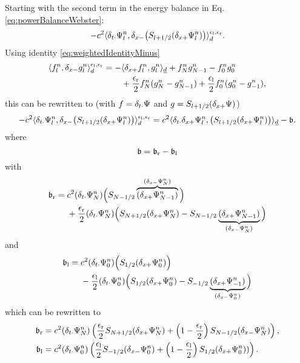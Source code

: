 Starting with the second term in the energy balance in Eq. \eqref{eq:powerBalanceWebster}:
\begin{equation}
    - c^2\langle\delta_{t\cdot}\Psi_l^n, \delta_{x-}\big(S_{l+1/2}(\delta_{x+}\Psi_l^n)\big)\rangle_d^{\epsilon_\text{l},\epsilon_\text{r}}.
\end{equation}
Using identity \eqref{eq:weightedIdentityMinus}
\begin{equation*}
    \begin{aligned}
    \langle f_l^n, \delta_{x-} g_l^n \rangle_d^{\epsilon_\text{l},\epsilon_\text{r}}  = -&\langle \delta_{x+} f_l^n, g_l^n \rangle_{\underline{d}}+ f_N^ng_{N-1}^n - f_0^ng_0^n \\
    &+ \frac{\epsilon_\text{r}}{2}f_N^n(g_N^n-g_{N-1}^n)+ \frac{\epsilon_\text{l}}{2}f_0^n(g_0^n - g_{-1}^n),
    \end{aligned}
\end{equation*}
this can be rewritten to (with $f=\delta_{t\cdot}\Psi$ and $g = S_{l+1/2}(\delta_{x+}\Psi)$)
\begin{equation*}
        -c^2\langle \delta_{t\cdot}\Psi_l^n,\delta_{x-} \big(S_{l+1/2}(\delta_{x+}\Psi_l^n)\big) \rangle_{d}^{\epsilon_\text{l},\epsilon_\text{r}} = c^2\langle \delta_{t\cdot}\delta_{x+} \Psi_l^n, \big(S_{l+1/2}(\delta_{x+}\Psi_l^n)\big)\rangle_{\underline{d}} - \mathfrak{b}.
\end{equation*}
where
\begin{equation}
    \mathfrak{b} = \mathfrak{b}_\text{r} - \mathfrak{b}_\text{l}
\end{equation}
with
\begin{equation*}
    \mathfrak{b}_\text{r} =  \begin{aligned}[t]
        &c^2 (\delta_{t\cdot}\Psi_N^n)\Big(S_{N-1/2}\overbrace{(\delta_{x+}\Psi_{N-1}^n)}^{(\delta_{x-}\Psi_{N}^n)}\Big)\\
        &+ \frac{\epsilon_\text{r}}{2}(\delta_{t\cdot}\Psi_{N}^n)\Big(S_{N+1/2}(\delta_{x+}\Psi_N^n)- S_{N-1/2}\underbrace{(\delta_{x+} \Psi_{N-1}^n)}_{(\delta_{x-}\Psi_{N}^n)}\Big)
    \end{aligned}
\end{equation*}
and 
\begin{equation*}
    \mathfrak{b}_\text{l} = \begin{aligned}[t]
        &c^2(\delta_{t\cdot}\Psi_0^n)\Big(S_{1/2}(\delta_{x+}\Psi_0^n)\Big)\\
        & -\frac{\epsilon_\text{l}}{2}(\delta_{t\cdot}\Psi_0^n)\Big(S_{1/2}(\delta_{x+}\Psi_0^n)-S_{-1/2}\underbrace{(\delta_{x+}\Psi_{-1}^n)}_{(\delta_{x-}\Psi_0^n)}\Big)
    \end{aligned}
\end{equation*}
which can be rewritten to
\begin{align}
    \mathfrak{b}_\text{r} &= c^2(\delta_{t\cdot}\Psi_N^n)\left(\frac{\epsilon_\text{r}}{2}S_{N+1/2}(\delta_{x+} \Psi_N^n) + \left(1-\frac{\epsilon_\text{r}}{2}\right)S_{N-1/2}(\delta_{x-}\Psi_N^n)\right),\\
    \mathfrak{b}_\text{l} &= c^2(\delta_{t\cdot}\Psi_0^n)\left(\frac{\epsilon_\text{l}}{2}S_{-1/2}(\delta_{x-}\Psi_0^n)+\left(1-\frac{\epsilon_\text{l}}{2}\right)S_{1/2}(\delta_{x+} \Psi_0^n))\right).
\end{align}

